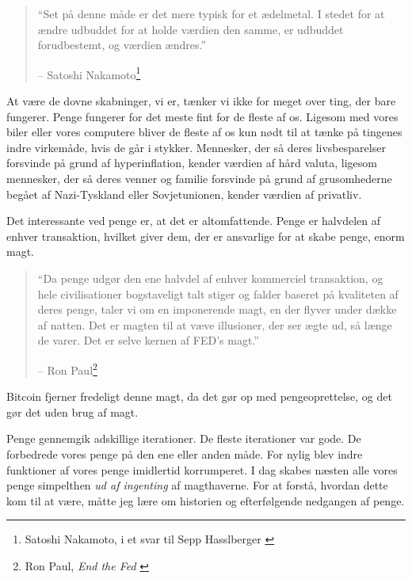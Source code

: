 \begin{quotation}\begin{samepage}
\enquote{Set på denne måde er det mere typisk for et ædelmetal. I stedet for at ændre udbuddet for at holde værdien den samme, er udbuddet forudbestemt, og værdien ændres.}
\begin{flushright} -- Satoshi Nakamoto\footnote{Satoshi Nakamoto, i et svar til Sepp
Hasslberger \cite{satoshi-precious-metal}}
\end{flushright}\end{samepage}\end{quotation}

At være de dovne skabninger, vi er, tænker vi ikke for meget over ting, der bare fungerer. Penge fungerer for det meste fint for de fleste af os. Ligesom med vores biler eller vores computere bliver de fleste af os kun nødt til at tænke på tingenes indre virkemåde, hvis de går i stykker. Mennesker, der så deres livsbesparelser forsvinde på grund af hyperinflation, kender værdien af hård valuta, ligesom mennesker, der så deres venner og familie forsvinde på grund af grusomhederne begået af Nazi-Tyskland eller Sovjetunionen, kender værdien af privatliv.

Det interessante ved penge er, at det er altomfattende. Penge er halvdelen af enhver transaktion, hvilket giver dem, der er ansvarlige for at skabe penge, enorm magt.

\begin{quotation}\begin{samepage}
\enquote{Da penge udgør den ene halvdel af enhver kommerciel transaktion, og hele civilisationer 
bogstaveligt talt stiger og falder baseret på kvaliteten af deres penge, taler vi om en imponerende 
magt, en der flyver under dække af natten. Det er magten til at væve illusioner, der ser ægte ud, 
så længe de varer. Det er selve kernen af FED's magt.}
\begin{flushright} -- Ron Paul\footnote{Ron Paul, \textit{End the Fed} \cite{end-the-fed}}
\end{flushright}\end{samepage}\end{quotation}

Bitcoin fjerner fredeligt denne magt, da det gør op med pengeoprettelse, og det gør det uden brug af magt.

Penge gennemgik adskillige iterationer. De fleste iterationer var gode. De forbedrede vores 
penge på den ene eller anden måde. For nylig blev indre funktioner af vores penge imidlertid 
korrumperet. I dag skabes næsten alle vores penge simpelthen \textit{ud af ingenting} af 
magthaverne. For at forstå, hvordan dette kom til at være, måtte jeg lære om historien og 
efterfølgende nedgangen af penge.

